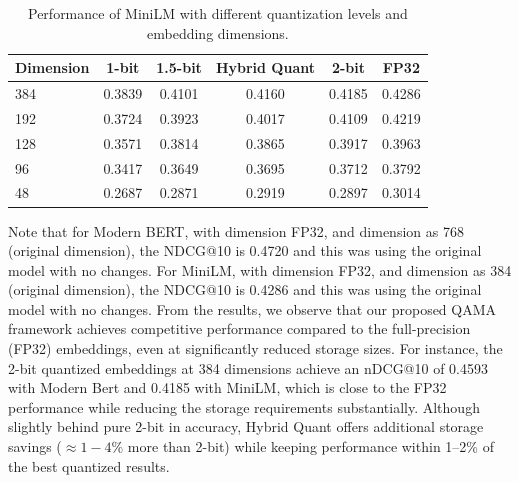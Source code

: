 \begin{table}[ht]
\caption{Performance of MiniLM with different quantization levels and embedding dimensions.}
\label{tab:minilm_main_results}
\centering
\begin{tabular}{lccccc}
\toprule
\textbf{Dimension} & \textbf{1-bit} & \textbf{1.5-bit} & \textbf{Hybrid Quant} & \textbf{2-bit} & \textbf{FP32} \\
\midrule
384 & 0.3839 & 0.4101 & 0.4160 & 0.4185 & 0.4286 \\
192 & 0.3724 & 0.3923 & 0.4017 & 0.4109 & 0.4219 \\
128 & 0.3571 & 0.3814 & 0.3865 & 0.3917 & 0.3963 \\
96 & 0.3417 & 0.3649 & 0.3695 & 0.3712 & 0.3792 \\
48 & 0.2687 & 0.2871 & 0.2919 & 0.2897 & 0.3014 \\
\bottomrule
\end{tabular}
\end{table}

Note that for Modern BERT, with dimension FP32, and dimension as 768 (original dimension), the NDCG@10 is 0.4720 and this was using the original model with no changes. 
For MiniLM, with dimension FP32, and dimension as 384 (original dimension), the NDCG@10 is 0.4286 and this was using the original model with no changes.
From the results, we observe that our proposed QAMA framework achieves competitive performance compared to the full-precision (FP32) embeddings, even at significantly reduced storage sizes. 
For instance, the 2-bit quantized embeddings at 384 dimensions achieve an nDCG@10 of 0.4593 with Modern Bert and 0.4185 with MiniLM, which is close to the FP32 performance while reducing the storage requirements substantially.
Although slightly behind pure 2-bit in accuracy, Hybrid Quant offers additional storage savings (\(\approx 1{-}4\%\) more than 2-bit) while keeping performance within 1--2\% of the best quantized results. 






